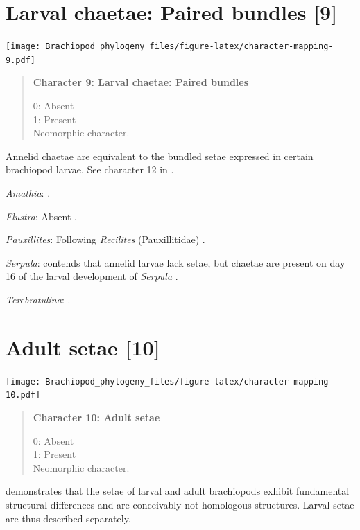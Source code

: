 \documentclass[openany]{book}
\begin{document}
\section{Larval chaetae: Paired bundles
{[}9{]}}\label{larval-chaetae-paired-bundles-9}

\texttt{[image: Brachiopod\_phylogeny\_files/figure-latex/character-mapping-9.pdf]}

\begin{quote}
\textbf{Character 9: Larval chaetae: Paired bundles}

0: Absent\\
1: Present\\
Neomorphic character.
\end{quote}

Annelid chaetae are equivalent to the bundled setae expressed in certain
brachiopod larvae. See character 12 in \citet{Vinther2008}.

\hypertarget{Amathia-coding-9}{}
\emph{Amathia}: \citep{Reed1982}.

\hypertarget{Flustra-coding-9}{}
\emph{Flustra}: Absent \citep{Zimmer2013}.

\hypertarget{Pauxillites-coding-9}{}
\emph{Pauxillites}: Following \emph{Recilites} (Pauxillitidae)
\citep{Dzik1978}.

\hypertarget{Serpula-coding-9}{}
\emph{Serpula}: \citet{Luter2000} contends that annelid larvae lack
setae, but chaetae are present on day 16 of the larval development of
\emph{Serpula} \citep{Keay2007}.

\hypertarget{Terebratulina-coding-9}{}
\emph{Terebratulina}: \citet{Williams1997Introduction}.

\section{Adult setae {[}10{]}}\label{adult-setae-10}

\texttt{[image: Brachiopod\_phylogeny\_files/figure-latex/character-mapping-10.pdf]}

\begin{quote}
\textbf{Character 10: Adult setae}

0: Absent\\
1: Present\\
Neomorphic character.
\end{quote}

\citet{Luter2000} demonstrates that the setae of larval and adult
brachiopods exhibit fundamental structural differences and are
conceivably not homologous structures. Larval setae are thus described
separately.
\end{document}
